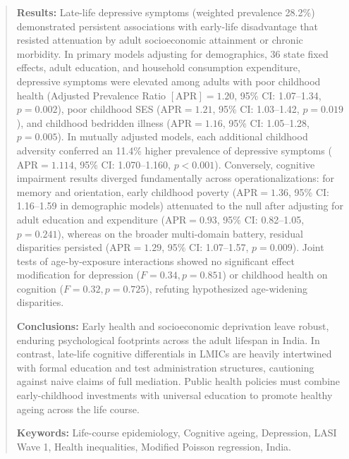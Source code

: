 \documentclass[11pt,a4paper]{article}
\begin{document}
\begin{abstract}
\vspace{0.2cm}
\noindent\textbf{Results:} Late-life depressive symptoms (weighted prevalence 28.2\%) demonstrated persistent associations with early-life disadvantage that resisted attenuation by adult socioeconomic attainment or chronic morbidity. In primary models adjusting for demographics, 36 state fixed effects, adult education, and household consumption expenditure, depressive symptoms were elevated among adults with poor childhood health (Adjusted Prevalence Ratio $[\text{APR}] = 1.20$, 95\% CI: 1.07--1.34, $p=0.002$), poor childhood SES ($\text{APR} = 1.21$, 95\% CI: 1.03--1.42, $p=0.019$), and childhood bedridden illness ($\text{APR} = 1.16$, 95\% CI: 1.05--1.28, $p=0.005$). In mutually adjusted models, each additional childhood adversity conferred an 11.4\% higher prevalence of depressive symptoms ($\text{APR} = 1.114$, 95\% CI: 1.070--1.160, $p<0.001$). Conversely, cognitive impairment results diverged fundamentally across operationalizations: for memory and orientation, early childhood poverty ($\text{APR} = 1.36$, 95\% CI: 1.16--1.59 in demographic models) attenuated to the null after adjusting for adult education and expenditure ($\text{APR} = 0.93$, 95\% CI: 0.82--1.05, $p=0.241$), whereas on the broader multi-domain battery, residual disparities persisted ($\text{APR} = 1.29$, 95\% CI: 1.07--1.57, $p=0.009$). Joint tests of age-by-exposure interactions showed no significant effect modification for depression ($F=0.34, p=0.851$) or childhood health on cognition ($F=0.32, p=0.725$), refuting hypothesized age-widening disparities.

\vspace{0.2cm}
\noindent\textbf{Conclusions:} Early health and socioeconomic deprivation leave robust, enduring psychological footprints across the adult lifespan in India. In contrast, late-life cognitive differentials in LMICs are heavily intertwined with formal education and test administration structures, cautioning against naive claims of full mediation. Public health policies must combine early-childhood investments with universal education to promote healthy ageing across the life course.

\vspace{0.2cm}
\noindent\textbf{Keywords:} Life-course epidemiology, Cognitive ageing, Depression, LASI Wave 1, Health inequalities, Modified Poisson regression, India.
\end{abstract}

\newpage
\tableofcontents
\newpage
\end{document}
